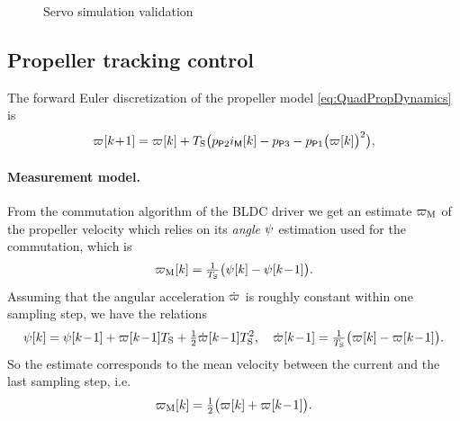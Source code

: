 \begin{figure}
 \centering
 \footnotesize
 
 \caption{Servo simulation validation}
 \label{fig:ServoSimRes}
\end{figure}

\subsection{Propeller tracking control}
The forward Euler discretization of the propeller model \eqref{eq:QuadPropDynamics} is
\begin{align}\label{eq:PropDynamics}
 \PropVel[][k\!+\!1] = \PropVel[][k] + \Ts \big( \PropParam[2] \BLDCCurr[][k] - \PropParam[3] - \PropParam[1] \big( \PropVel[][k]\big)^2 \big),
\end{align}

\paragraph*{Measurement model.}
From the commutation algorithm of the BLDC driver we get an estimate $\PropVelMeas$ of the propeller velocity which relies on its \textit{angle} $\PropAngle$ estimation used for the commutation, which is
\begin{align}
 \PropVelMeas[][k] = \tfrac{1}{\Ts} \big( \PropAngle[][k] - \PropAngle[][k\!-\!1] \big)
 .
\end{align} 
Assuming that the angular acceleration $\PropVeld$ is roughly constant within one sampling step, we have the relations
\begin{align}
 \PropAngle[][k] = \PropAngle[][k\!-\!1] + \PropVel[][k\!-\!1] \Ts + \tfrac{1}{2} \PropVeld[][k\!-\!1] \Ts^2,
\quad
 \PropVeld[][k\!-\!1] = \tfrac{1}{\Ts} \big( \PropVel[][k] - \PropVel[][k\!-\!1] \big)
 .
\end{align}
So the estimate corresponds to the mean velocity between the current and the last sampling step, i.e.\
\begin{align}\label{eq:PropMeaseq}
 \PropVelMeas[][k] = \tfrac{1}{2} \big( \PropVel[][k] + \PropVel[][k\!-\!1] \big)
 .
\end{align} 

